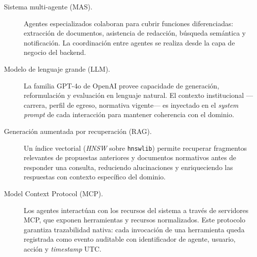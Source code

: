 \begin{description}
  \item[Sistema multi-agente (MAS).] Agentes especializados colaboran para
    cubrir funciones diferenciadas: extracción de documentos, asistencia de
    redacción, búsqueda semántica y notificación.
    La coordinación entre agentes se realiza desde la capa de negocio del backend.

  \item[Modelo de lenguaje grande (LLM).] La familia GPT-4o de OpenAI provee
    capacidade de generación, reformulación y evaluación en lenguaje natural.
    El contexto institucional ---carrera, perfil de egreso, normativa vigente---
    es inyectado en el \textit{system prompt} de cada interacción para mantener
    coherencia con el dominio.

  \item[Generación aumentada por recuperación (RAG).] Un índice vectorial
    (\textit{HNSW} sobre \texttt{hnswlib}) permite recuperar fragmentos
    relevantes de propuestas anteriores y documentos normativos antes de
    responder una consulta, reduciendo alucinaciones y enriqueciendo
    las respuestas con contexto específico del dominio.

  \item[Model Context Protocol (MCP).] Los agentes interactúan con los recursos
    del sistema a través de servidores MCP, que exponen herramientas y recursos
    normalizados. Este protocolo garantiza trazabilidad nativa: cada invocación
    de una herramienta queda registrada como evento auditable con identificador
    de agente, usuario, acción y \textit{timestamp} UTC.
\end{description}

